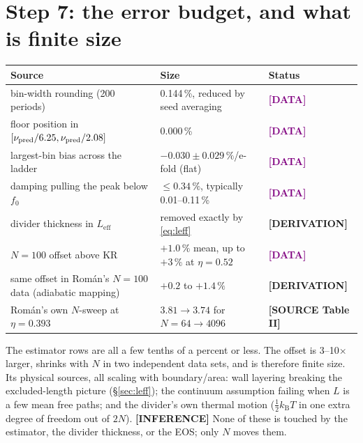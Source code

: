 \documentclass[11pt,a4paper]{article}
\newcommand{\kT}{k_{\mathrm B}T}
\newcommand{\Leff}{L_{\mathrm{eff}}}
\newcommand{\src}[1]{\textcolor{OliveGreen}{\textbf{[SOURCE #1]}}}
\newcommand{\der}{\textcolor{NavyBlue}{\textbf{[DERIVATION]}}}
\newcommand{\infr}{\textcolor{BurntOrange}{\textbf{[INFERENCE]}}}
\newcommand{\dat}{\textcolor{Purple}{\textbf{[DATA]}}}
\begin{document}
\section{Step 7: the error budget, and what is finite size}
\label{sec:finite}
\begin{center}
\footnotesize
\begin{tabular}{@{}p{6.2cm}p{6.2cm}l@{}}
\toprule
Source & Size & Status \\
\midrule
bin-width rounding (200 periods) & 0.144\,\%, reduced by seed averaging & \dat{} \\
floor position in $[\nu_{\rm pred}/6.25, \nu_{\rm pred}/2.08]$ & 0.000\,\% & \dat{} \\
largest-bin bias across the ladder & $-0.030\pm0.029\,\%$/e-fold (flat) & \dat{} \\
damping pulling the peak below $f_0$ & $\le 0.34\,\%$, typically 0.01--0.11\,\% & \dat{} \\
divider thickness in $\Leff$ & removed exactly by \eqref{eq:leff} & \der{} \\
\midrule
$N=100$ offset above KR & $+1.0\,\%$ mean, up to $+3\,\%$ at $\eta=0.52$ & \dat{} \\
same offset in Rom\'an's $N=100$ data (adiabatic mapping) & $+0.2$ to $+1.4\,\%$ & \der{} \\
Rom\'an's own $N$-sweep at $\eta=0.393$ & $3.81\to3.74$ for $N=64\to4096$ & \src{Table II} \\
\bottomrule
\end{tabular}
\end{center}
The estimator rows are all a few tenths of a percent or less. The offset is 3--10$\times$ larger, shrinks with $N$ in two independent data sets, and is therefore finite size. Its physical sources, all scaling with boundary/area: wall layering breaking the excluded-length picture (\S\ref{sec:leff}); the continuum assumption failing when $L$ is a few mean free paths; and the divider's own thermal motion ($\tfrac12\kT$ in one extra degree of freedom out of $2N$). \infr{} None of these is touched by the estimator, the divider thickness, or the EOS; only $N$ moves them.
\end{document}
